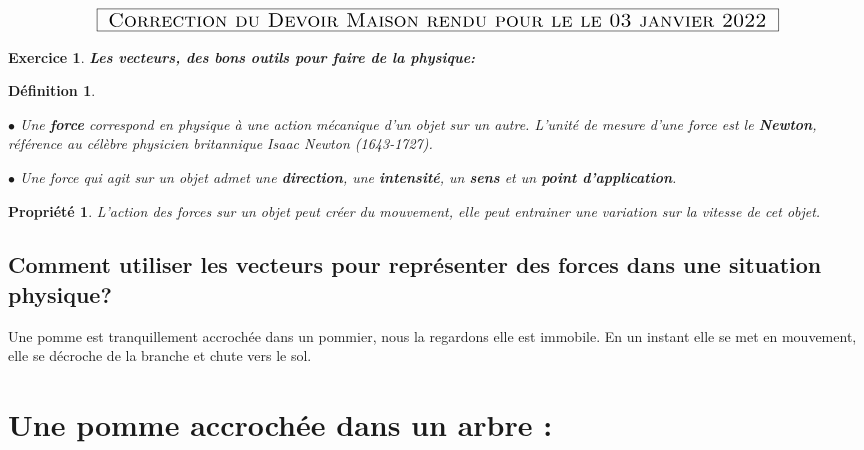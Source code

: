 \documentclass[a4paper,10.9pt]{article}
\newtheorem{defi}{Définition}
\newtheorem{prop}{Propriété}
\theoremstyle{definition}
\newtheorem{exo}{Exercice}
\begin{document}
	
\chead{}\renewcommand{\headrulewidth}{0.4pt}\renewcommand{\footrulewidth}{0.4pt}

\hfill\\[-1cm]
$$	\fbox{\text{\Large{ \sc Correction du Devoir Maison rendu pour le le 03 janvier  2022 }}}$$	


\begin{exo}\textit{\textbf{Les vecteurs, des bons outils pour faire de la physique:}} 
\begin{defi}\quad\\
	\par $\bullet$ \quad Une \textbf{ force} correspond en physique à une action mécanique d'un objet sur un autre. L'unité de mesure d'une force est le \textbf{Newton}, référence au célèbre physicien britannique Isaac Newton (1643-1727).\\
	\par $\bullet$ \quad Une force qui agit sur un objet admet une \textbf{direction}, une \textbf{intensité}, un \textbf{sens} et un \textbf{point d'application}.   
\end{defi}  
\begin{prop}
	L'action des forces sur un objet peut créer du mouvement, elle peut entrainer une variation sur la vitesse de cet objet.
\end{prop}
\subsection*{Comment utiliser les vecteurs pour représenter des forces dans une situation physique?}
\noindent Une pomme est tranquillement accrochée dans un pommier, nous la regardons elle est immobile. En un instant elle se met en mouvement, elle se décroche de la branche et chute vers le sol. 
\section*{Une pomme accrochée dans un arbre :}


\end{exo}
\end{document}
